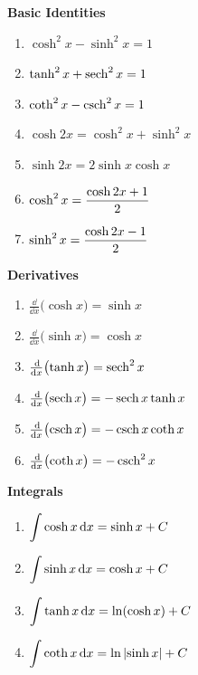 {
\begin{keyidea}\label{idea:hyperbolic_identities}%
\begin{minipage}[t]{.33\linewidth}
\textbf{Basic Identities}\par
{}%
\begin{enumerate}
\item $\cosh^2x-\sinh^2x=1$
\item	$\tanh^2x+\operatorname{sech}^2x=1$
\item	$\coth^2x-\operatorname{csch}^2x = 1$
\item	$\cosh 2x=\cosh^2x+\sinh^2x$
\item	$\sinh 2x = 2\sinh x\cosh x$
\item	$\displaystyle\cosh^2x = \frac{\cosh 2x+1}{2}$
\item $\displaystyle \sinh^2x=\frac{\cosh 2x-1}{2}$
\end{enumerate}
\end{minipage}%
\begin{minipage}[t]{.33\linewidth}
\textbf{Derivatives}
\begin{enumerate}
\item $\frac{\dd}{\dd x}\bigl(\cosh x\bigr) = \sinh x$
\item $\frac{\dd}{\dd x}\bigl(\sinh x\bigr) = \cosh x$
\item $\frac{\operatorname{d}\!}{\operatorname{d}\! x}\bigl(\tanh x\bigr) = \operatorname{sech}^2 x$
\item $\frac{\operatorname{d}\!}{\operatorname{d}\! x}\bigl(\operatorname{sech} x\bigr) = -\operatorname{sech} x\tanh x$
\item $\frac{\operatorname{d}\!}{\operatorname{d}\! x}\bigl(\operatorname{csch} x\bigr) = -\operatorname{csch} x\coth x$
\item $\frac{\operatorname{d}\!}{\operatorname{d}\! x}\bigl(\coth x\bigr) = -\operatorname{csch}^2x$
\end{enumerate}
\end{minipage}%
\begin{minipage}[t]{.33\linewidth}
\textbf{Integrals}
\begin{enumerate}
\item $\displaystyle\int \cosh x\operatorname{d}\! x = \sinh x+C$
\item $\displaystyle\int \sinh x\operatorname{d}\! x = \cosh x+C$
\item $\displaystyle\int \tanh x\operatorname{d}\! x = \ln(\cosh x) +C$
\item $\displaystyle\int \coth x\operatorname{d}\! x = \ln\left\lvert \sinh x \right\rvert+C$
\end{enumerate}
\end{minipage}
\end{keyidea}
}

